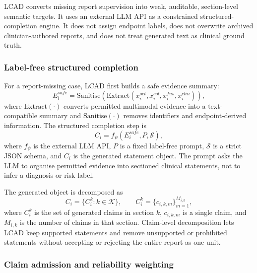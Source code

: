 LCAD converts missing report supervision into weak, auditable, section-level semantic targets. It uses an external LLM API as a constrained structured-completion engine. It does not assign endpoint labels, does not overwrite archived clinician-authored reports, and does not treat generated text as clinical ground truth.

\subsubsection{Label-free structured completion}
\label{subsubsec:lcad_generation_final_topcs}

For a report-missing case, LCAD first builds a safe evidence summary:
\begin{equation}
E_i^{safe}
=
\mathrm{Sanitise}(\mathrm{Extract}(x_i^{oct},x_i^{col},x_i^{fus},x_i^{clin})),
\label{eq:mosaic_safe_evidence_final_topcs}
\end{equation}
where $\mathrm{Extract}(\cdot)$ converts permitted multimodal evidence into a text-compatible summary and $\mathrm{Sanitise}(\cdot)$ removes identifiers and endpoint-derived information. The structured completion step is
\begin{equation}
C_i=f_{\psi}(E_i^{safe},P,\mathcal{S}),
\label{eq:mosaic_llm_completion_final_topcs}
\end{equation}
where $f_{\psi}$ is the external LLM API, $P$ is a fixed label-free prompt, $\mathcal{S}$ is a strict JSON schema, and $C_i$ is the generated statement object. The prompt asks the LLM to organise permitted evidence into sectioned clinical statements, not to infer a diagnosis or risk label.

The generated object is decomposed as
\begin{equation}
C_i=\{C_i^k:k\in\mathcal{K}\},
\qquad
C_i^k=\{c_{i,k,m}\}_{m=1}^{M_{i,k}},
\label{eq:mosaic_claim_object_final_topcs}
\end{equation}
where $C_i^k$ is the set of generated claims in section $k$, $c_{i,k,m}$ is a single claim, and $M_{i,k}$ is the number of claims in that section. Claim-level decomposition lets LCAD keep supported statements and remove unsupported or prohibited statements without accepting or rejecting the entire report as one unit.

\subsubsection{Claim admission and reliability weighting}
\label{subsubsec:claim_audit_final_topcs}

